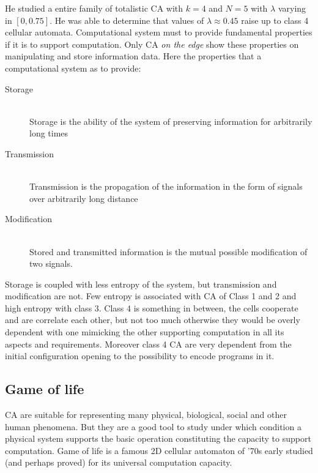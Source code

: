 He studied a entire family of totalistic CA with $k=4
$ and $N=5$ with $\lambda$
varying in $[0,0.75]$. He was able to determine that values
of $\lambda\approx0.45$ raise up to class 4 cellular
automata.
Computational system must to provide fundamental properties if it is
to support computation. Only CA  \emph{on the edge} show these properties on
manipulating and store information data.
Here the properties that a computational system as to provide:
\begin{description}
  \item[Storage] \hfill \\
  Storage is the ability of the system of preserving information for
arbitrarily long times
  \item[Transmission] \hfill \\
  Transmission is the propagation of the information in the
form of signals over arbitrarily long distance
  \item[Modification] \hfill \\
Stored and transmitted
information is the mutual possible modification of two signals.

\end{description}

Storage is coupled with less entropy of the system, but transmission and
modification are not. Few entropy is associated with CA of Class 1 and 2 and
high entropy with class 3. Class 4 is something in between, the cells cooperate
and are correlate each other, but not too much otherwise they would be overly
dependent with one mimicking the other supporting computation in all its aspects
and requirements. Moreover class 4 CA are very dependent from the initial
configuration opening to the possibility to encode programs in it.

\subsection{Game of life}\label{sect:GOL}
CA are suitable for representing many physical, biological, social and other
human phenomena. But they are a good tool to study under which condition a
physical system supports the basic operation constituting the capacity to
support computation. Game of life is a famous 2D
cellular automaton of '70s early studied (and perhaps proved) for its universal
computation capacity.



